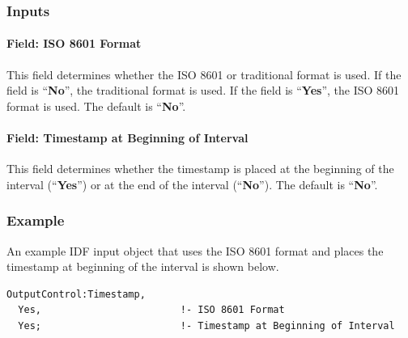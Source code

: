 \subsubsection{Inputs}\label{inputs-for-timestamp}

\paragraph{Field: ISO 8601 Format}\label{field-timestamp-iso8601format}

This field determines whether the ISO 8601 or traditional format is used. If the field is ``\textbf{No}'', the traditional format is
used. If the field is ``\textbf{Yes}'', the ISO 8601 format is used. The default is ``\textbf{No}''.

\paragraph{Field: Timestamp at Beginning of Interval}\label{field-timestamp-beginning}

This field determines whether the timestamp is placed at the beginning of the interval (``\textbf{Yes}'') or at the end of the
interval (``\textbf{No}''). The default is ``\textbf{No}''.

\subsubsection{Example}\label{example-for-timestamp}

An example IDF input object that uses the ISO 8601 format and places the timestamp at beginning of the interval is shown below.
\begin{lstlisting}
OutputControl:Timestamp,
  Yes,                        !- ISO 8601 Format
  Yes;                        !- Timestamp at Beginning of Interval
\end{lstlisting}
